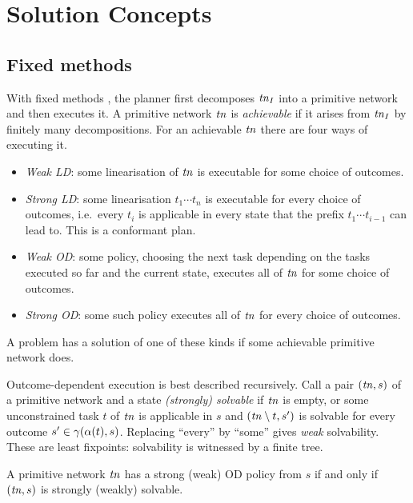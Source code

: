 \section{Solution Concepts}\label{sec:solutions}

\subsection{Fixed methods}

With fixed methods \pCBa{}, the planner first decomposes $\mathit{tn}_I$ into a primitive network and then
executes it. A primitive network $\mathit{tn}$ is \emph{achievable} if it arises from $\mathit{tn}_I$ by finitely
many decompositions. For an achievable $\mathit{tn}$ there are four ways of executing it.

\begin{itemize}
  \item \emph{Weak LD}: some linearisation of $\mathit{tn}$ is executable for some choice of outcomes.
  \item \emph{Strong LD}: some linearisation $t_1\cdots t_n$ is executable for every choice of
    outcomes, i.e.\ every $t_i$ is applicable in every state that the prefix $t_1\cdots t_{i-1}$
    can lead to. This is a conformant plan.
  \item \emph{Weak OD}: some policy, choosing the next task depending on the tasks executed so far
    and the current state, executes all of $\mathit{tn}$ for some choice of outcomes.
  \item \emph{Strong OD}: some such policy executes all of $\mathit{tn}$ for every choice of outcomes.
\end{itemize}

A problem has a solution of one of these kinds if some achievable primitive network does.

Outcome-dependent execution is best described recursively. Call a pair $(\mathit{tn},s)$ of a primitive
network and a state \emph{(strongly) solvable} if $\mathit{tn}$ is empty, or some unconstrained task
$t$ of $\mathit{tn}$ is applicable in $s$ and $(\mathit{tn}\setminus t,s')$ is solvable for every outcome
$s'\in\gamma(\alpha(t),s)$. Replacing ``every'' by ``some'' gives \emph{weak} solvability.
These are least fixpoints: solvability is witnessed by a finite tree.

\begin{proposition}\label{prop:od-belief}
  A primitive network $\mathit{tn}$ has a strong (weak) OD policy from $s$ if and only if $(\mathit{tn},s)$ is
  strongly (weakly) solvable.
\end{proposition}

